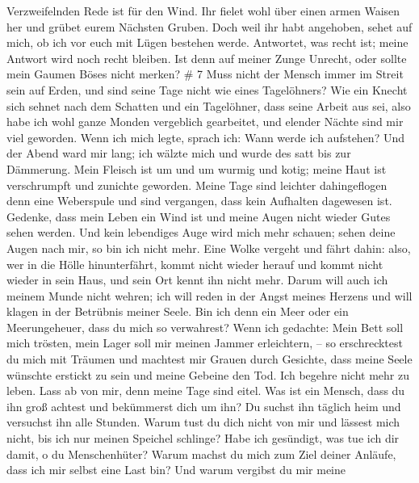 Verzweifelnden Rede ist für den Wind.  Ihr fielet wohl über
einen armen Waisen her und grübet eurem Nächsten Gruben. 
Doch weil ihr habt angehoben, sehet auf mich, ob ich vor euch mit Lügen
bestehen werde.  Antwortet, was recht ist; meine Antwort
wird noch recht bleiben.  Ist denn auf meiner Zunge
Unrecht, oder sollte mein Gaumen Böses nicht merken? \# 7 
Muss nicht der Mensch immer im Streit sein auf Erden, und sind seine
Tage nicht wie eines Tagelöhners?  Wie ein Knecht sich
sehnet nach dem Schatten und ein Tagelöhner, dass seine Arbeit aus sei,
 also habe ich wohl ganze Monden vergeblich gearbeitet, und
elender Nächte sind mir viel geworden.  Wenn ich mich legte,
sprach ich: Wann werde ich aufstehen? Und der Abend ward mir lang; ich
wälzte mich und wurde des satt bis zur Dämmerung.  Mein
Fleisch ist um und um wurmig und kotig; meine Haut ist verschrumpft und
zunichte geworden.  Meine Tage sind leichter dahingeflogen
denn eine Weberspule und sind vergangen, dass kein Aufhalten dagewesen
ist.  Gedenke, dass mein Leben ein Wind ist und meine Augen
nicht wieder Gutes sehen werden.  Und kein lebendiges Auge
wird mich mehr schauen; sehen deine Augen nach mir, so bin ich nicht
mehr.  Eine Wolke vergeht und fährt dahin: also, wer in die
Hölle hinunterfährt, kommt nicht wieder herauf  und kommt
nicht wieder in sein Haus, und sein Ort kennt ihn nicht mehr.
 Darum will auch ich meinem Munde nicht wehren; ich will
reden in der Angst meines Herzens und will klagen in der Betrübnis
meiner Seele.  Bin ich denn ein Meer oder ein
Meerungeheuer, dass du mich so verwahrest?  Wenn ich
gedachte: Mein Bett soll mich trösten, mein Lager soll mir meinen Jammer
erleichtern, --  so erschrecktest du mich mit Träumen und
machtest mir Grauen durch Gesichte,  dass meine Seele
wünschte erstickt zu sein und meine Gebeine den Tod.  Ich
begehre nicht mehr zu leben. Lass ab von mir, denn meine Tage sind
eitel.  Was ist ein Mensch, dass du ihn groß achtest und
bekümmerst dich um ihn?  Du suchst ihn täglich heim und
versuchst ihn alle Stunden.  Warum tust du dich nicht von
mir und lässest mich nicht, bis ich nur meinen Speichel schlinge?
 Habe ich gesündigt, was tue ich dir damit, o du
Menschenhüter? Warum machst du mich zum Ziel deiner Anläufe, dass ich
mir selbst eine Last bin?  Und warum vergibst du mir meine
